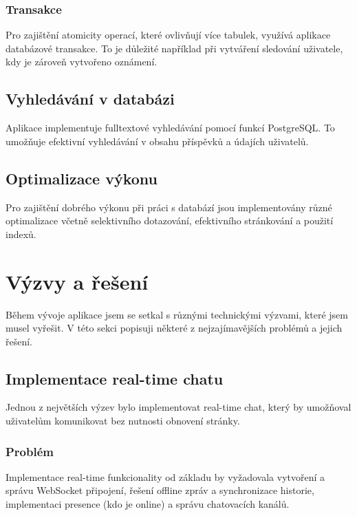 \documentclass[12pt]{article}
\begin{document}
\subsubsection{Transakce}

Pro zajištění atomicity operací, které ovlivňují více tabulek, využívá aplikace databázové transakce. To je důležité například při vytváření sledování uživatele, kdy je zároveň vytvořeno oznámení.

\subsection{Vyhledávání v databázi}

Aplikace implementuje fulltextové vyhledávání pomocí funkcí PostgreSQL. To umožňuje efektivní vyhledávání v obsahu příspěvků a údajích uživatelů. 

\subsection{Optimalizace výkonu}

Pro zajištění dobrého výkonu při práci s databází jsou implementovány různé optimalizace včetně selektivního dotazování, efektivního stránkování a použití indexů.

\newpage
\section{Výzvy a řešení}

Během vývoje aplikace jsem se setkal s různými technickými výzvami, které jsem musel vyřešit. V této sekci popisuji některé z nejzajímavějších problémů a jejich řešení.

\subsection{Implementace real-time chatu}

Jednou z největších výzev bylo implementovat real-time chat, který by umožňoval uživatelům komunikovat bez nutnosti obnovení stránky.

\subsubsection{Problém}

Implementace real-time funkcionality od základu by vyžadovala vytvoření a správu WebSocket připojení, řešení offline zpráv a synchronizace historie, implementaci presence (kdo je online) a správu chatovacích kanálů.
\end{document}
